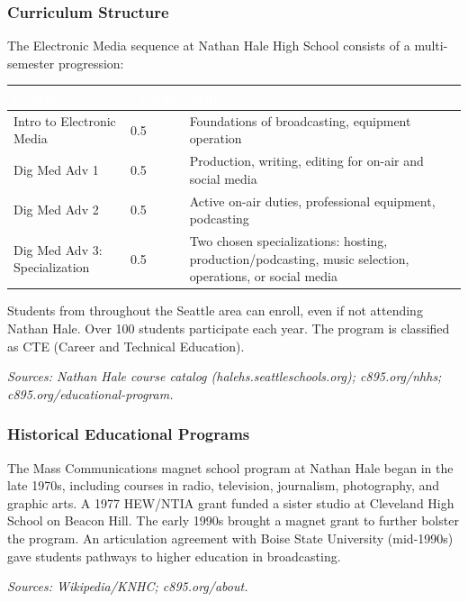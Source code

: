 \documentclass[11pt,letterpaper]{article}
\newcommand{\tableheader}[1]{\textbf{\sffamily\textcolor{white}{#1}}}
\begin{document}
\subsubsection{Curriculum Structure}

The Electronic Media sequence at Nathan Hale High School consists of a multi-semester progression:

\begin{center}
\begin{tabularx}{\textwidth}{L{4cm}C{1.5cm}X}
\toprule
{}
\tableheader{Course} & \tableheader{Credits} & \tableheader{Skills} \\
\midrule
Intro to Electronic Media & 0.5 & Foundations of broadcasting, equipment operation \\
Dig Med Adv 1 & 0.5 & Production, writing, editing for on-air and social media \\
Dig Med Adv 2 & 0.5 & Active on-air duties, professional equipment, podcasting \\
Dig Med Adv 3: Specialization & 0.5 & Two chosen specializations: hosting, production/podcasting, music selection, operations, or social media \\
\bottomrule
\end{tabularx}
\end{center}

Students from throughout the Seattle area can enroll, even if not attending Nathan Hale. Over 100 students participate each year. The program is classified as CTE (Career and Technical Education).

\textit{Sources: Nathan Hale course catalog (halehs.seattleschools.org); c895.org/nhhs; c895.org/educational-program.}

\subsubsection{Historical Educational Programs}

The Mass Communications magnet school program at Nathan Hale began in the late 1970s, including courses in radio, television, journalism, photography, and graphic arts. A 1977 HEW/NTIA grant funded a sister studio at Cleveland High School on Beacon Hill. The early 1990s brought a magnet grant to further bolster the program. An articulation agreement with Boise State University (mid-1990s) gave students pathways to higher education in broadcasting.

\textit{Sources: Wikipedia/KNHC; c895.org/about.}
\end{document}
